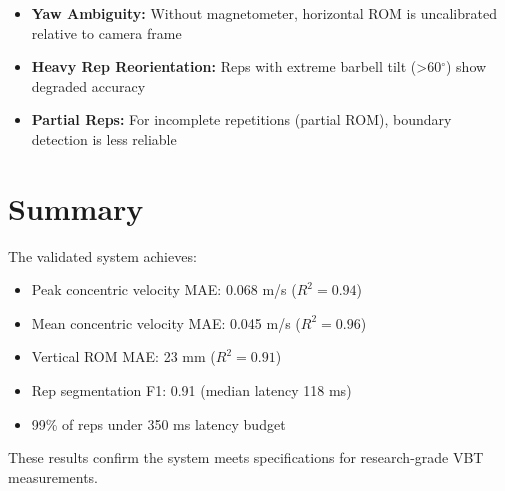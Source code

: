 \begin{itemize}
    \item \textbf{Yaw Ambiguity:} Without magnetometer, horizontal ROM is uncalibrated relative to camera frame
    \item \textbf{Heavy Rep Reorientation:} Reps with extreme barbell tilt (>60$^\circ$) show degraded accuracy
    \item \textbf{Partial Reps:} For incomplete repetitions (partial ROM), boundary detection is less reliable
\end{itemize}

\section{Summary}

The validated system achieves:
\begin{itemize}
    \item Peak concentric velocity MAE: 0.068 m/s ($R^2 = 0.94$)
    \item Mean concentric velocity MAE: 0.045 m/s ($R^2 = 0.96$)
    \item Vertical ROM MAE: 23 mm ($R^2 = 0.91$)
    \item Rep segmentation F1: 0.91 (median latency 118 ms)
    \item 99\% of reps under 350 ms latency budget
\end{itemize}

These results confirm the system meets specifications for research-grade VBT measurements.

\newpage